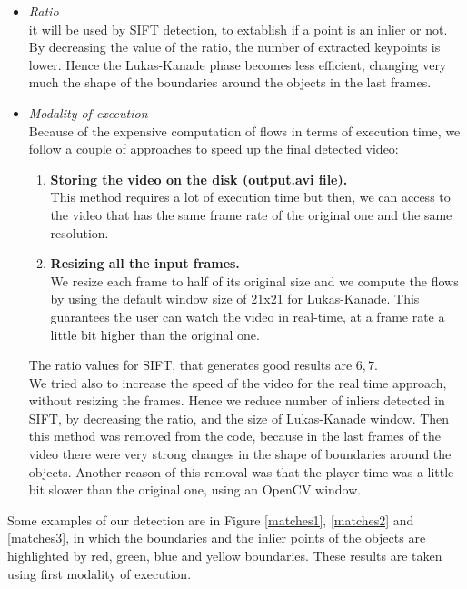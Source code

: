 \documentclass{article}
\begin{document}
\begin{itemize}
\item{\textit{Ratio}\\
it will be used by SIFT detection, to extablish if a point is an inlier or not. By decreasing the value of the ratio, the number of extracted keypoints is lower. Hence the Lukas-Kanade phase becomes less efficient, changing very much the shape of the boundaries around the objects in the last frames.
}
\item{\textit{Modality of execution}\\
Because of the expensive computation of flows in terms of execution time, we follow a couple of approaches to speed up the final detected video:
\begin{enumerate}
\item{\textbf{Storing the video on the disk (output.avi file).}\\
This method requires a lot of execution time but then, we can access to the video that has the same frame rate of the original one and the same resolution.}
\item{\textbf{Resizing all the input frames.}\\
We resize each frame to half of its original size and we compute the flows by using the default window size of 21x21 for Lukas-Kanade. This guarantees the user can watch the video in real-time, at a frame rate a little bit higher than the original one.}
\end{enumerate}
The ratio values for SIFT, that generates good results are $6,7$.\\
We tried also to increase the speed of the video for the real time approach, without resizing the frames. Hence we reduce number of inliers detected in SIFT, by decreasing the ratio, and the size of Lukas-Kanade window. Then this method was removed from the code, because in the last frames of the video there were very strong changes in the shape of boundaries around the objects. Another reason of this removal was that the player time was a little bit slower than the original one, using an OpenCV window.
}
\end{itemize}
Some examples of our detection are in Figure \ref{matches1}, \ref{matches2} and \ref{matches3}, in which the boundaries and the inlier points of the objects are highlighted by red, green, blue and yellow boundaries. These results are taken using first modality of execution.
\end{document}
